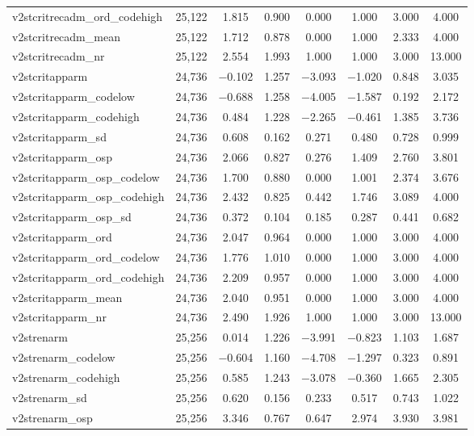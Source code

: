 \begin{table}[!htbp]
\begin{tabular}{@{\extracolsep{5pt}}lccccccc}
v2stcritrecadm\_ord\_codehigh & 25,122 & 1.815 & 0.900 & 0.000 & 1.000 & 3.000 & 4.000 \\ 
v2stcritrecadm\_mean & 25,122 & 1.712 & 0.878 & 0.000 & 1.000 & 2.333 & 4.000 \\ 
v2stcritrecadm\_nr & 25,122 & 2.554 & 1.993 & 1.000 & 1.000 & 3.000 & 13.000 \\ 
v2stcritapparm & 24,736 & $-$0.102 & 1.257 & $-$3.093 & $-$1.020 & 0.848 & 3.035 \\ 
v2stcritapparm\_codelow & 24,736 & $-$0.688 & 1.258 & $-$4.005 & $-$1.587 & 0.192 & 2.172 \\ 
v2stcritapparm\_codehigh & 24,736 & 0.484 & 1.228 & $-$2.265 & $-$0.461 & 1.385 & 3.736 \\ 
v2stcritapparm\_sd & 24,736 & 0.608 & 0.162 & 0.271 & 0.480 & 0.728 & 0.999 \\ 
v2stcritapparm\_osp & 24,736 & 2.066 & 0.827 & 0.276 & 1.409 & 2.760 & 3.801 \\ 
v2stcritapparm\_osp\_codelow & 24,736 & 1.700 & 0.880 & 0.000 & 1.001 & 2.374 & 3.676 \\ 
v2stcritapparm\_osp\_codehigh & 24,736 & 2.432 & 0.825 & 0.442 & 1.746 & 3.089 & 4.000 \\ 
v2stcritapparm\_osp\_sd & 24,736 & 0.372 & 0.104 & 0.185 & 0.287 & 0.441 & 0.682 \\ 
v2stcritapparm\_ord & 24,736 & 2.047 & 0.964 & 0.000 & 1.000 & 3.000 & 4.000 \\ 
v2stcritapparm\_ord\_codelow & 24,736 & 1.776 & 1.010 & 0.000 & 1.000 & 3.000 & 4.000 \\ 
v2stcritapparm\_ord\_codehigh & 24,736 & 2.209 & 0.957 & 0.000 & 1.000 & 3.000 & 4.000 \\ 
v2stcritapparm\_mean & 24,736 & 2.040 & 0.951 & 0.000 & 1.000 & 3.000 & 4.000 \\ 
v2stcritapparm\_nr & 24,736 & 2.490 & 1.926 & 1.000 & 1.000 & 3.000 & 13.000 \\ 
v2strenarm & 25,256 & 0.014 & 1.226 & $-$3.991 & $-$0.823 & 1.103 & 1.687 \\ 
v2strenarm\_codelow & 25,256 & $-$0.604 & 1.160 & $-$4.708 & $-$1.297 & 0.323 & 0.891 \\ 
v2strenarm\_codehigh & 25,256 & 0.585 & 1.243 & $-$3.078 & $-$0.360 & 1.665 & 2.305 \\ 
v2strenarm\_sd & 25,256 & 0.620 & 0.156 & 0.233 & 0.517 & 0.743 & 1.022 \\ 
v2strenarm\_osp & 25,256 & 3.346 & 0.767 & 0.647 & 2.974 & 3.930 & 3.981 \\ 

\end{tabular}
\end{table}
